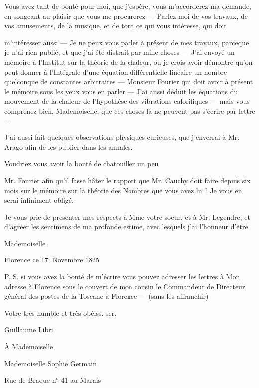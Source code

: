 \documentclass[11pt,a4paper]{article}
\begin{document}
Vous avez tant de bonté pour moi, que j'espère, vous m'accorderez ma demande,
en songeant au plaisir que vous me procurerez — Parlez-moi de vos travaux, de
vos amusements, de la musique, et de tout ce qui vous intéresse, qui doit

m'intéresser aussi — Je ne peux vous parler à présent de mes travaux,
parceque je n'ai rien publié, et que j'ai été distrait par mille choses —
J'ai envoyé un mémoire à l'Institut sur la théorie de la chaleur, ou je crois
avoir démontré qu'on peut donner à l'Intégrale d'une équation différentielle
linéaire un nombre quelconque de constantes arbitraires — Monsieur Fourier
qui doit avoir à présent le mémoire sous les yeux  vous
en parler — J'ai aussi déduit les équations du mouvement de la chaleur de
l'hypothèse des vibrations calorifiques — mais vous comprenez bien,
Mademoiselle, que ces choses là ne peuvent pas s'écrire par lettre —


J'ai aussi fait quelques observations physiques curieuses, que j'enverrai à
Mr. Arago afin de les publier dans les annales.

Voudriez vous avoir la bonté de chatouiller un peu

Mr. Fourier afin qu'il fasse hâter le rapport que Mr. Cauchy doit faire
depuis six mois sur le mémoire sur la théorie des Nombres que vous avez lu ?
Je vous en serai infiniment obligé.

Je vous prie de presenter mes respects à Mme votre soeur, et à Mr. Legendre,
et d'agréer les sentimens de ma profonde estime, avec lesquels j'ai l'honneur
d'être

Mademoiselle

Florence ce 17. Novembre 1825

P. S. si vous avez la bonté de m'écrire vous pouvez adresser les lettres à
Mon adresse à Florence sous le couvert de mon cousin le Commandeur de
 Directeur général des postes de la Toscane à Florence —
(sans les affranchir)

Votre très humble et très obéiss. ser.

Guillaume Libri

À Mademoiselle

Mademoiselle Sophie Germain

Rue de Braque n° 41 au Marais
\end{document}
